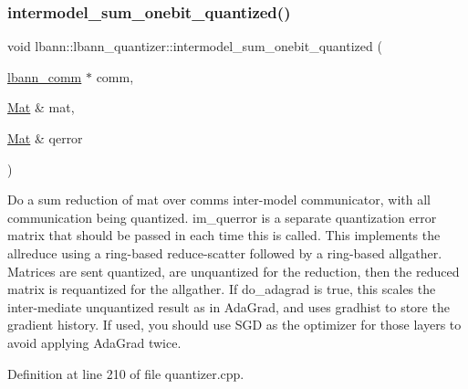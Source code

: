 \subsubsection{\texorpdfstring{intermodel\+\_\+sum\+\_\+onebit\+\_\+quantized()}{intermodel\_sum\_onebit\_quantized()}\hspace{0.1cm}{\footnotesize\ttfamily [1/2]}}
{\footnotesize\ttfamily void lbann\+::lbann\+\_\+quantizer\+::intermodel\+\_\+sum\+\_\+onebit\+\_\+quantized (\begin{DoxyParamCaption}\item[{\hyperlink{classlbann_1_1lbann__comm}{lbann\+\_\+comm} $\ast$}]{comm,  }\item[{\hyperlink{base_8hpp_a68f11fdc31b62516cb310831bbe54d73}{Mat} \&}]{mat,  }\item[{\hyperlink{base_8hpp_a68f11fdc31b62516cb310831bbe54d73}{Mat} \&}]{qerror }\end{DoxyParamCaption})}

Do a sum reduction of mat over comm\textquotesingle{}s inter-\/model communicator, with all communication being quantized. im\+\_\+querror is a separate quantization error matrix that should be passed in each time this is called. This implements the allreduce using a ring-\/based reduce-\/scatter followed by a ring-\/based allgather. Matrices are sent quantized, are unquantized for the reduction, then the reduced matrix is requantized for the allgather. If do\+\_\+adagrad is true, this scales the inter-\/mediate unquantized result as in Ada\+Grad, and uses gradhist to store the gradient history. If used, you should use S\+GD as the optimizer for those layers to avoid applying Ada\+Grad twice. 

Definition at line 210 of file quantizer.\+cpp.


